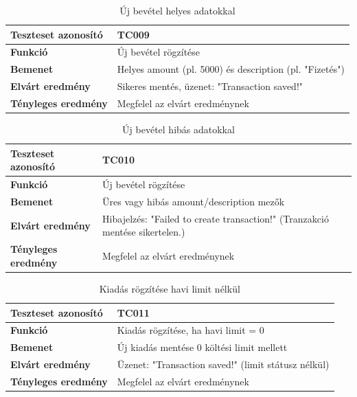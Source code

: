 \begin{table}[h!]
	\centering
	\begin{tabular}{|l|p{10cm}|}
		\hline
		\textbf{Teszteset azonosító} & TC009 \\ \hline
		\textbf{Funkció} & Új bevétel rögzítése \\ \hline
		\textbf{Bemenet} & Helyes amount (pl. 5000) és description (pl. "Fizetés") \\ \hline
		\textbf{Elvárt eredmény} & Sikeres mentés, üzenet: "Transaction saved!" \\ \hline
		\textbf{Tényleges eredmény} & Megfelel az elvárt eredménynek \\ \hline
	\end{tabular}
	\caption{Új bevétel helyes adatokkal}
	\label{tab:uj_bevetel_helyes}
\end{table}

\begin{table}[h!]
	\centering
	\begin{tabular}{|l|p{10cm}|}
		\hline
		\textbf{Teszteset azonosító} & TC010 \\ \hline
		\textbf{Funkció} & Új bevétel rögzítése \\ \hline
		\textbf{Bemenet} & Üres vagy hibás amount/description mezők \\ \hline
		\textbf{Elvárt eredmény} & Hibajelzés: "Failed to create transaction!" (Tranzakció mentése sikertelen.) \\ \hline
		\textbf{Tényleges eredmény} & Megfelel az elvárt eredménynek \\ \hline
	\end{tabular}
	\caption{Új bevétel hibás adatokkal}
	\label{tab:uj_bevetel_hibas}
\end{table}

\begin{table}[h!]
	\centering
	\begin{tabular}{|l|p{10cm}|}
		\hline
		\textbf{Teszteset azonosító} & TC011 \\ \hline
		\textbf{Funkció} & Kiadás rögzítése, ha havi limit = 0 \\ \hline
		\textbf{Bemenet} & Új kiadás mentése 0 költési limit mellett \\ \hline
		\textbf{Elvárt eredmény} & Üzenet: "Transaction saved!" (limit státusz nélkül) \\ \hline
		\textbf{Tényleges eredmény} & Megfelel az elvárt eredménynek \\ \hline
	\end{tabular}
	\caption{Kiadás rögzítése havi limit nélkül}
	\label{tab:kiadas_limit_nelkul}
\end{table}

